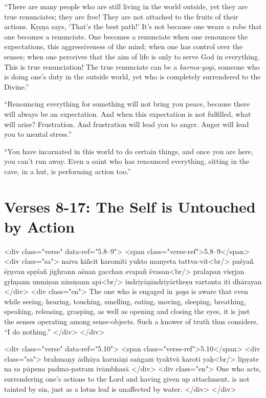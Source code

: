 \enquote{There are many people who are still living in the world outside, yet they are true renunciates; they are free! They are not attached to the fruits of their actions. Kṛṣṇa says, \enquote{That’s the best path!} It’s not because one wears a robe that one becomes a renunciate. One becomes a renunciate when one renounces the expectations, this aggressiveness of the mind; when one has control over the senses; when one perceives that the aim of life is only to serve God in everything. This is true renunciation! The true renunciate can be a \textit{karma-yogī}, someone who is doing one’s duty in the outside world, yet who is completely surrendered to the Divine.}

\enquote{Renouncing everything for something will not bring you peace, because there will always be an expectation. And when this expectation is not fulfilled, what will arise? Frustration. And frustration will lead you to anger. Anger will lead you to mental stress.}

\enquote{You have incarnated in this world to do certain things, and once you are here, you can’t run away. Even a saint who has renounced everything, sitting in the cave, in a hut, is performing action too.}

\newpage
\section{Verses 8-17: The Self is Untouched by Action}\label{sec-verses-8-17-the-self-is-untouched-by-action}


\begin{html}
<div class="verse" data-ref="5.8–9">
  <span class="verse-ref">5.8–9</span>
  <div class="sa">
    naiva kiñcit karomīti yukto manyeta tattva-vit<br/>
    paśyañ śṛṇvan spṛśañ jighrann aśnan gacchan svapañ śvasan<br/>
    pralapan visṛjan gṛhṇann unmiṣan nimiṣann api<br/>
    indriyāṇīndriyārtheṣu vartanta iti dhārayan
  </div>
  <div class="en">
    The one who is engaged in \textit{yoga} is aware that even while seeing, hearing, touching, smelling, eating, moving, sleeping, breathing, speaking, releasing, grasping, as well as opening and closing the eyes, it is just the senses operating among sense-objects. Such a knower of truth thus considers, \enquote{I do nothing.}
  </div>
</div>
\end{html}



\begin{html}
<div class="verse" data-ref="5.10">
  <span class="verse-ref">5.10</span>
  <div class="sa">
    brahmaṇy ādhāya karmāṇi saṅgaṁ tyaktvā karoti yaḥ<br/>
    lipyate na sa pāpena padma-patram ivāmbhasā
  </div>
  <div class="en">
    One who acts, surrendering one’s actions to the Lord and having given up attachment, is not tainted by sin, just as a lotus leaf is unaffected by water.
  </div>
</div>
\end{html}



